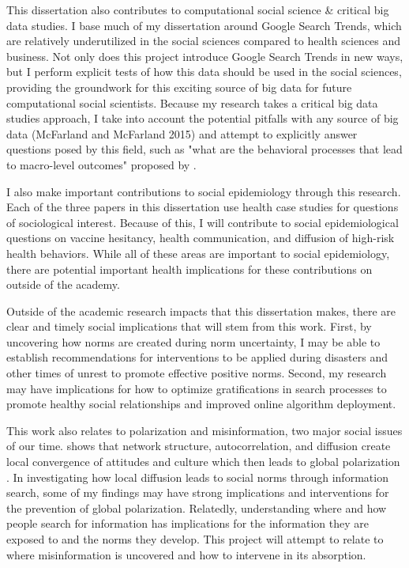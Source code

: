 This dissertation also contributes to computational social science &
critical big data studies. I base much of my dissertation around Google
Search Trends, which are relatively underutilized in the social sciences
compared to health sciences and business. Not only does this project
introduce Google Search Trends in new ways, but I perform explicit tests
of how this data should be used in the social sciences, providing the
groundwork for this exciting source of big data for future computational
social scientists. Because my research takes a critical big data studies
approach, I take into account the potential pitfalls with any source of
big data (McFarland and McFarland 2015) and attempt to explicitly answer
questions posed by this field, such as "what are the behavioral
processes that lead to macro-level outcomes" proposed by \citet{breigerScaling2015}.

I also make important contributions to social epidemiology through this
research. Each of the three papers in this dissertation use health case
studies for questions of sociological interest. Because of this, I will
contribute to social epidemiological questions on vaccine hesitancy,
health communication, and diffusion of high-risk health behaviors. While
all of these areas are important to social epidemiology, there are
potential important health implications for these contributions on
outside of the academy.

Outside of the academic research impacts that this dissertation makes,
there are clear and timely social implications that will stem from this
work. First, by uncovering how norms are created during norm
uncertainty, I may be able to establish recommendations for
interventions to be applied during disasters and other times of unrest
to promote effective positive norms. Second, my research may have
implications for how to optimize gratifications in search processes to
promote healthy social relationships and improved online algorithm
deployment.

This work also relates to polarization and misinformation, two major
social issues of our time. \citet{axelrodDisseminationCultureModel1997} shows that network structure,
autocorrelation, and diffusion create local convergence of attitudes and
culture which then leads to global polarization \citep{dellapostaWhyLiberalsDrink2015}. In investigating how local diffusion leads to social norms
through information search, some of my findings may have strong
implications and interventions for the prevention of global
polarization. Relatedly, understanding where and how people search for
information has implications for the information they are exposed to and
the norms they develop. This project will attempt to relate to where
misinformation is uncovered and how to intervene in its absorption.

